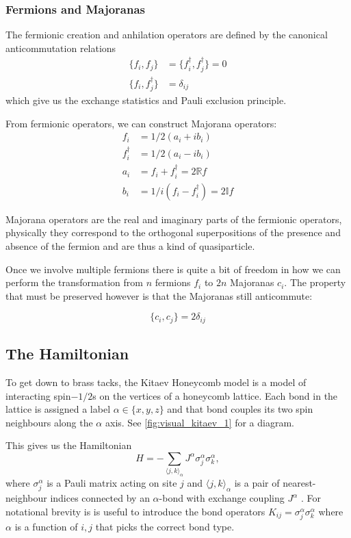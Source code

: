 \hypertarget{fermions-and-majoranas}{%
\subsubsection{Fermions and Majoranas}\label{fermions-and-majoranas}}

The fermionic creation and anhilation operators are defined by the
canonical anticommutation relations \[\begin{aligned}
\{f_i, f_j\} &= \{f^\dagger_i, f^\dagger_j\} = 0\\
\{f_i, f^\dagger_j\} &= \delta_{ij}
\end{aligned}\] which give us the exchange statistics and Pauli
exclusion principle.

From fermionic operators, we can construct Majorana operators:
\[\begin{aligned}
f_i         &= 1/2 (a_i + ib_i)\\
f^\dagger_i &= 1/2(a_i - ib_i)\\
a_i         &= f_i + f^\dagger_i = 2\mathbb{R}f\\
b_i         &= 1/i(f_i - f^\dagger_i) = 2\mathbb{I} f 
\end{aligned}\]

Majorana operators are the real and imaginary parts of the fermionic
operators, physically they correspond to the orthogonal superpositions
of the presence and absence of the fermion and are thus a kind of
quasiparticle.

Once we involve multiple fermions there is quite a bit of freedom in how
we can perform the transformation from \(n\) fermions \(f_i\) to \(2n\)
Majoranas \(c_i\). The property that must be preserved however is that
the Majoranas still anticommute:

\[ \{c_i, c_j\} = 2\delta_{ij}\]

\hypertarget{the-hamiltonian}{%
\subsection{The Hamiltonian}\label{the-hamiltonian}}

To get down to brass tacks, the Kitaev Honeycomb model is a model of
interacting spin\(-1/2\)s on the vertices of a honeycomb lattice. Each
bond in the lattice is assigned a label \(\alpha \in \{ x, y, z\}\) and
that bond couples its two spin neighbours along the \(\alpha\) axis. See
\cref{fig:visual_kitaev_1} for a diagram.

This gives us the Hamiltonian
\[H =  - \sum_{\langle j,k\rangle_\alpha} J^{\alpha}\sigma_j^{\alpha}\sigma_k^{\alpha},\]
where \(\sigma^\alpha_j\) is a Pauli matrix acting on site \(j\) and
\(\langle j,k\rangle_\alpha\) is a pair of nearest-neighbour indices
connected by an \(\alpha\)-bond with exchange coupling \(J^\alpha\)
\textcite{kitaevAnyonsExactlySolved2006}. For notational brevity is is
useful to introduce the bond operators
\(K_{ij} = \sigma_j^{\alpha}\sigma_k^{\alpha}\) where \(\alpha\) is a
function of \(i,j\) that picks the correct bond type.

